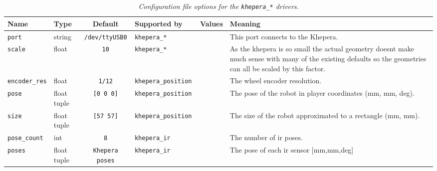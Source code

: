 \begin{table}[ht]
\begin{center}
{\small \begin{tabular}{|l|l|c|l|l|l|} \hline
Name & Type & Default & Supported by &  Values & Meaning \\ \hline
{\tt port} & string & {\tt /dev/ttyUSB0} & {\tt khepera\_*} &  & This port connects to the Khepera.\\ \hline
{\tt scale} & float & {\tt 10} & {\tt khepera\_*} & & As the khepera is so small the actual geometry doesnt make much sense with many of the existing defaults so the geometries can all be scaled by this factor. \\ \hline

{\tt encoder\_res} & float & {\tt 1/12} & {\tt khepera\_position } & & The wheel encoder resolution. \\ \hline
{\tt pose} & float tuple & {\tt [0 0 0]} & {\tt khepera\_position } & & The pose of the robot in player coordinates (mm, mm, deg). \\ \hline
{\tt size} & float tuple & {\tt [57 57]} & {\tt khepera\_position } & & The size of the robot approximated to a rectangle (mm, mm). \\ \hline

{\tt pose\_count} & int & {\tt 8} & {\tt khepera\_ir } & & The number of ir poses. \\ \hline
{\tt poses} & float tuple & {\tt Khepera poses} & {\tt khepera\_ir } & & The pose of each ir sensor [mm,mm,deg] \\ \hline

\end{tabular}}
\end{center}
\caption{{\em Configuration file options for the {\tt khepera\_*} drivers}.}
\label{table:khepera_options}
\end{table}


